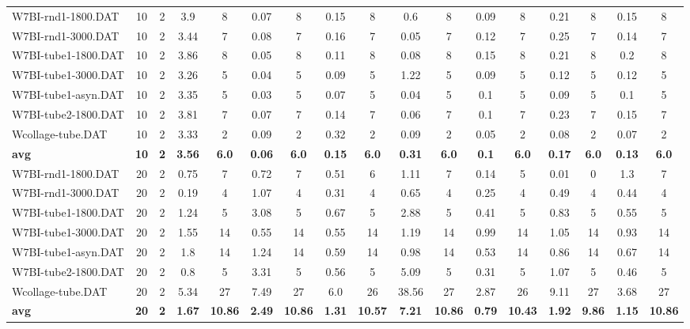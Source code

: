 \begin{table}[!ht]
{\begin{tabular}{lcccccccccccccccc}
W7BI-rnd1-1800.DAT & 10 & 2 & 3.9 & 8 & 0.07 & 8 & 0.15 & 8 & 0.6 & 8 & 0.09 & 8 & 0.21 & 8 & 0.15 & 8 \\
W7BI-rnd1-3000.DAT & 10 & 2 & 3.44 & 7 & 0.08 & 7 & 0.16 & 7 & 0.05 & 7 & 0.12 & 7 & 0.25 & 7 & 0.14 & 7 \\
W7BI-tube1-1800.DAT & 10 & 2 & 3.86 & 8 & 0.05 & 8 & 0.11 & 8 & 0.08 & 8 & 0.15 & 8 & 0.21 & 8 & 0.2 & 8 \\
W7BI-tube1-3000.DAT & 10 & 2 & 3.26 & 5 & 0.04 & 5 & 0.09 & 5 & 1.22 & 5 & 0.09 & 5 & 0.12 & 5 & 0.12 & 5 \\
W7BI-tube1-asyn.DAT & 10 & 2 & 3.35 & 5 & 0.03 & 5 & 0.07 & 5 & 0.04 & 5 & 0.1 & 5 & 0.09 & 5 & 0.1 & 5 \\
W7BI-tube2-1800.DAT & 10 & 2 & 3.81 & 7 & 0.07 & 7 & 0.14 & 7 & 0.06 & 7 & 0.1 & 7 & 0.23 & 7 & 0.15 & 7 \\
Wcollage-tube.DAT & 10 & 2 & 3.33 & 2 & 0.09 & 2 & 0.32 & 2 & 0.09 & 2 & 0.05 & 2 & 0.08 & 2 & 0.07 & 2 \\
\cline{1-17} \textbf{avg} & \textbf{10} & \textbf{2} & \textbf{3.56} & \textbf{6.0} & \textbf{0.06} & \textbf{6.0} & \textbf{0.15} & \textbf{6.0} & \textbf{0.31} & \textbf{6.0} & \textbf{0.1} & \textbf{6.0} & \textbf{0.17} & \textbf{6.0} & \textbf{0.13} & \textbf{6.0} \\ \cline{1-17}
W7BI-rnd1-1800.DAT & 20 & 2 & 0.75 & 7 & 0.72 & 7 & 0.51 & 6 & 1.11 & 7 & 0.14 & 5 & 0.01 & 0 & 1.3 & 7 \\
W7BI-rnd1-3000.DAT & 20 & 2 & 0.19 & 4 & 1.07 & 4 & 0.31 & 4 & 0.65 & 4 & 0.25 & 4 & 0.49 & 4 & 0.44 & 4 \\
W7BI-tube1-1800.DAT & 20 & 2 & 1.24 & 5 & 3.08 & 5 & 0.67 & 5 & 2.88 & 5 & 0.41 & 5 & 0.83 & 5 & 0.55 & 5 \\
W7BI-tube1-3000.DAT & 20 & 2 & 1.55 & 14 & 0.55 & 14 & 0.55 & 14 & 1.19 & 14 & 0.99 & 14 & 1.05 & 14 & 0.93 & 14 \\
W7BI-tube1-asyn.DAT & 20 & 2 & 1.8 & 14 & 1.24 & 14 & 0.59 & 14 & 0.98 & 14 & 0.53 & 14 & 0.86 & 14 & 0.67 & 14 \\
W7BI-tube2-1800.DAT & 20 & 2 & 0.8 & 5 & 3.31 & 5 & 0.56 & 5 & 5.09 & 5 & 0.31 & 5 & 1.07 & 5 & 0.46 & 5 \\
Wcollage-tube.DAT & 20 & 2 & 5.34 & 27 & 7.49 & 27 & 6.0 & 26 & 38.56 & 27 & 2.87 & 26 & 9.11 & 27 & 3.68 & 27 \\
\cline{1-17} \textbf{avg} & \textbf{20} & \textbf{2} & \textbf{1.67} & \textbf{10.86} & \textbf{2.49} & \textbf{10.86} & \textbf{1.31} & \textbf{10.57} & \textbf{7.21} & \textbf{10.86} & \textbf{0.79} & \textbf{10.43} & \textbf{1.92} & \textbf{9.86} & \textbf{1.15} & \textbf{10.86} \\ \cline{1-17}

\end{tabular}}
\end{table}
